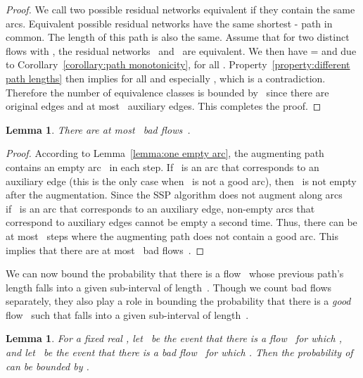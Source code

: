 \documentclass[11pt]{article}
\newtheorem{lemma}[theorem]{Lemma}
\begin{document}
\begin{proof}
We call two possible residual networks equivalent if they contain the same arcs. Equivalent possible residual networks have the same shortest - path in common. The length of this path is also the same. Assume that for two distinct flows  with , the residual networks~ and~ are equivalent. We then have  =  and due to Corollary~\ref{corollary:path monotonicity},  for all . Property~\ref{property:different path lengths} then implies  for all  and especially , which is a contradiction. Therefore the number of equivalence classes is bounded by~ since there are~ original edges and at most~ auxiliary edges. This completes the proof. \end{proof}

\begin{lemma}
\label{lemma:upper bound bad flows}
There are at most~ bad flows~.
\end{lemma}

\begin{proof}
According to Lemma~\ref{lemma:one empty arc}, the augmenting path contains an empty arc~
in each step. If~ is an arc that corresponds to an auxiliary edge (this is the only case when~ is not a good arc), then~ is not empty after the augmentation. Since the SSP algorithm does not augment along arcs~ if~ is an arc that corresponds to an auxiliary edge, non-empty arcs that correspond to auxiliary edges cannot be empty a second time. Thus, there can be at most~ steps where the augmenting path does not contain a good arc. This implies that there are at most~ bad flows~. \end{proof}

We can now bound the probability that there is a flow~ whose previous path's length  falls into a given sub-interval of length~. Though we count bad flows separately, they also play a role in bounding the probability that there is a \emph{good} flow~ such that  falls into a given sub-interval of length~.

\begin{lemma}
\label{lemma:loser gap}
For a fixed real , let~ be the event that there is a flow~ for which , and let~ be the event that there is a bad flow~ for which . Then the probability of~ can be bounded by
.
\end{lemma}
\end{document}
